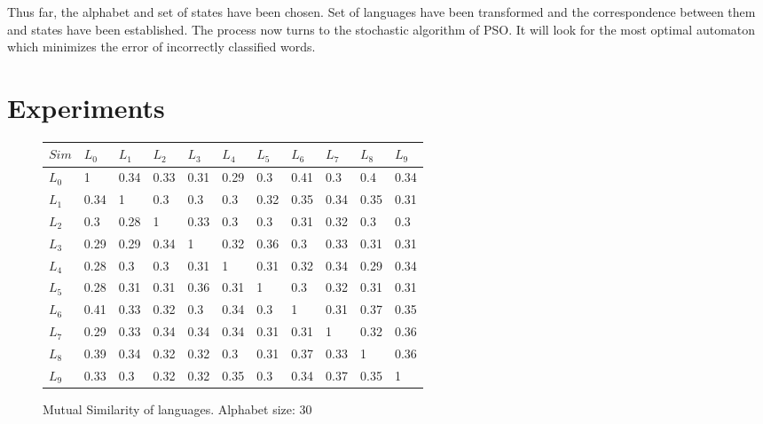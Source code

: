 \documentclass{mini}
\begin{document}
Thus far, the alphabet and set of states have been chosen. Set of languages have been transformed and the correspondence between them and states have been established. The process now turns to the stochastic algorithm of PSO. It will look for the most optimal automaton which minimizes the error of incorrectly classified words.


\chapter{Experiments}\label{chap:experiments}




%
%
\begin{figure}[H]
    \CenterFloatBoxes
    \begin{floatrow}
        
        \ttabbox
        {
            \centering
            \setlength{\tabcolsep}{10pt}
            \renewcommand{\arraystretch}{1.5}
            \begin{tabular}{|P{1.0cm} || P{0.6cm} | P{0.6cm} | P{0.6cm} | P{0.6cm} | P{0.6cm} | P{0.6cm} |P{0.6cm} | P{0.6cm} |P{0.6cm} | P{0.6cm}|}
                \hline
                $Sim$ & $L_{0}$ & $L_{1}$ & $L_{2}$ & $L_{3}$ & $L_{4}$ & $L_{5}$ & $L_{6}$ & $L_{7}$ & $L_{8}$ & $L_{9}$ \\
                \hline
                \hline
                $L_{0}$ &1&0.34&0.33&0.31&0.29&0.3&0.41&0.3&0.4&0.34\\ 
                \hline 
                $L_{1}$ &0.34&1&0.3&0.3&0.3&0.32&0.35&0.34&0.35&0.31\\ 
                \hline 
                $L_{2}$ &0.3&0.28&1&0.33&0.3&0.3&0.31&0.32&0.3&0.3\\ 
                \hline 
                $L_{3}$ &0.29&0.29&0.34&1&0.32&0.36&0.3&0.33&0.31&0.31\\ 
                \hline 
                $L_{4}$ &0.28&0.3&0.3&0.31&1&0.31&0.32&0.34&0.29&0.34\\ 
                \hline 
                $L_{5}$ &0.28&0.31&0.31&0.36&0.31&1&0.3&0.32&0.31&0.31\\ 
                \hline 
                $L_{6}$ &0.41&0.33&0.32&0.3&0.34&0.3&1&0.31&0.37&0.35\\ 
                \hline 
                $L_{7}$ &0.29&0.33&0.34&0.34&0.34&0.31&0.31&1&0.32&0.36\\ 
                \hline 
                $L_{8}$ &0.39&0.34&0.32&0.32&0.3&0.31&0.37&0.33&1&0.36\\ 
                \hline 
                $L_{9}$ &0.33&0.3&0.32&0.32&0.35&0.3&0.34&0.37&0.35&1\\ 
                \hline 
            \end{tabular}
        }
        {\caption{Mutual Similarity of languages. Alphabet size: 30}
            \label{fig:tab_similarity}}
        

\end{floatrow}
\end{figure}
\end{document}
